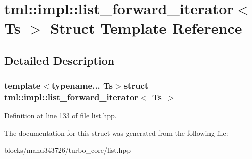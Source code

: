 \hypertarget{structtml_1_1impl_1_1list__forward__iterator}{\section{tml\+:\+:impl\+:\+:list\+\_\+forward\+\_\+iterator$<$ Ts $>$ Struct Template Reference}
\label{structtml_1_1impl_1_1list__forward__iterator}
}


\subsection{Detailed Description}
\subsubsection*{template$<$typename... Ts$>$struct tml\+::impl\+::list\+\_\+forward\+\_\+iterator$<$ Ts $>$}



Definition at line 133 of file list.\+hpp.



The documentation for this struct was generated from the following file\+:\begin{DoxyCompactItemize}
\item 
blocks/manu343726/turbo\+\_\+core/list.\+hpp\end{DoxyCompactItemize}
